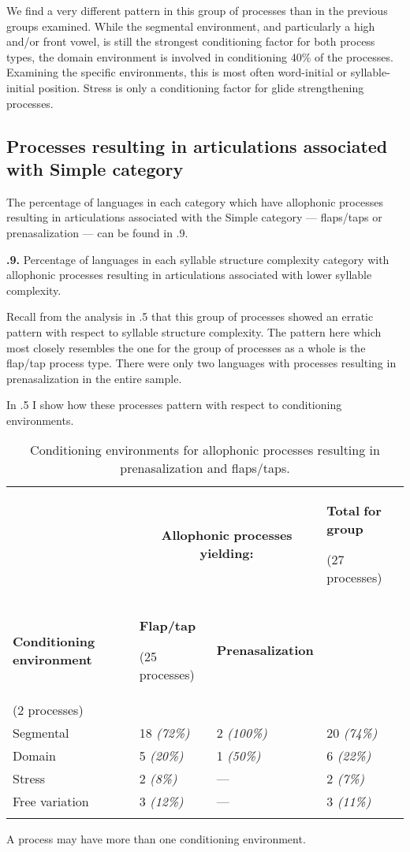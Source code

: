   We find a very different pattern in this group of processes than in the previous groups examined. While the segmental environment, and particularly a high and/or front vowel, is still the strongest conditioning factor for both process types, the domain environment is involved in conditioning 40\% of the processes. Examining the specific environments, this is most often word-initial or syllable-initial position. Stress is only a conditioning factor for glide strengthening processes.

\subsection{Processes resulting in articulations associated with Simple category}\label{sec:7.3.5}

  The percentage of languages in each category which have allophonic processes resulting in articulations associated with the Simple category — flaps/taps or prenasalization — can be found in .9.

\textbf{.9.} Percentage of languages in each syllable structure complexity category with allophonic processes resulting in articulations associated with lower syllable complexity.

  Recall from the analysis in .5 that this group of processes showed an erratic pattern with respect to syllable structure complexity. The pattern here which most closely resembles the one for the group of processes as a whole is the flap/tap process type. There were only two languages with processes resulting in prenasalization in the entire sample.

  In .5 I show how these processes pattern with respect to conditioning environments.

\begin{table}
\begin{tabularx}{\textwidth}{XXXX}
\lsptoprule
 & \multicolumn{2}{c}{ \textbf{Allophonic} \textbf{processes} \textbf{yielding:}} & { \textbf{Total} \textbf{for} \textbf{group}}

 (27 processes)\\
 \textbf{Conditioning} \textbf{environment} & { \textbf{Flap/tap}}

 (25 processes) & \textbf{Prenasalization}\\
(2 processes) & \\
 Segmental & 18 \textit{(72\%)} & 2 \textit{(100\%)} & 20 \textit{(74\%)}\\
 Domain & 5 \textit{(20\%)} & 1 \textit{(50\%)} & 6 \textit{(22\%)}\\
 Stress & 2 \textit{(8\%)} & — & 2 \textit{(7\%)}\\
 Free variation & 3 \textit{(12\%)} & — & 3 \textit{(11\%)}\\
\lspbottomrule
\end{tabularx}
\caption{\label{7.5}Conditioning environments for allophonic processes resulting in prenasalization and flaps/taps.}A process may have more than one conditioning environment.
\end{table}

